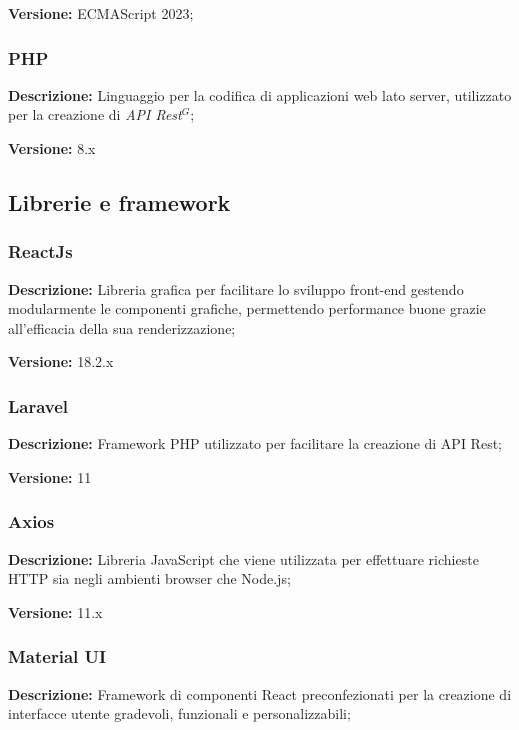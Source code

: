\textbf{Versione:} ECMAScript 2023;

\subsubsection{PHP}

\textbf{Descrizione:} Linguaggio per la codifica di applicazioni web lato server, utilizzato per la creazione di \emph{API Rest}$^{G}$;

\textbf{Versione:} 8.x


\subsection{Librerie e framework}

\subsubsection{ReactJs}

\textbf{Descrizione:} Libreria grafica per facilitare lo
sviluppo front-end gestendo modularmente le componenti grafiche,
permettendo performance buone grazie all'efficacia della sua renderizzazione;

\textbf{Versione:} 18.2.x

\subsubsection{Laravel}

\textbf{Descrizione:} Framework PHP utilizzato per facilitare la creazione di API Rest;

\textbf{Versione:} 11

\subsubsection{Axios}

\textbf{Descrizione:} Libreria JavaScript che viene utilizzata per effettuare richieste HTTP sia negli ambienti browser che Node.js;

\textbf{Versione:} 11.x

\subsubsection{Material UI}

\textbf{Descrizione:} Framework di componenti React preconfezionati per la creazione di interfacce
utente gradevoli, funzionali e personalizzabili;

